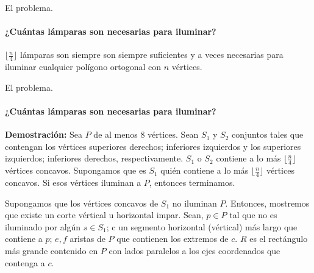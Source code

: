 \begin{frame}{El problema.} %
  \framesubtitle{¿Cuántas lámparas son necesarias para iluminar?} %
  \begin{teorema}
    $\lfloor \frac{n}{4} \rfloor$ lámparas son siempre son siempre suficientes y a veces necesarias
    para iluminar cualquier polígono ortogonal con $n$ vértices.
  \end{teorema}
\end{frame}

\begin{frame}{El problema.} %
  \framesubtitle{¿Cuántas lámparas son necesarias para iluminar?} %
  \textbf{Demostración:}
    Sea $P$ de al menos $8$ vértices. Sean $S_1$ y $S_2$ conjuntos tales que contengan los vértices superiores derechos; inferiores izquierdos
    y los superiores izquierdos; inferiores derechos, respectivamente. $S_1$ o $S_2$ contiene a lo más $\lfloor \frac{n}{4} \rfloor$ vértices
    concavos. Supongamos que es $S_1$ quién contiene a lo más $\lfloor \frac{n}{4} \rfloor$ vértices concavos.
    Si esos vértices iluminan a $P$, entonces terminamos.\newline
    
    Supongamos que los vértices concavos de $S_1$ no iluminan $P$. Entonces, mostremos que existe un corte vértical u horizontal impar.
    Sean, $p \in P$ tal que no es iluminado por algún $s \in S_1$; c un segmento horizontal (vértical) más largo que contiene a $p$;
    $e, f$ aristas de $P$ que contienen los extremos de $c$. $R$ es el rectángulo más grande contenido en $P$ con lados paralelos a
    los ejes coordenados que contenga a $c$.\newline
\end{frame}

